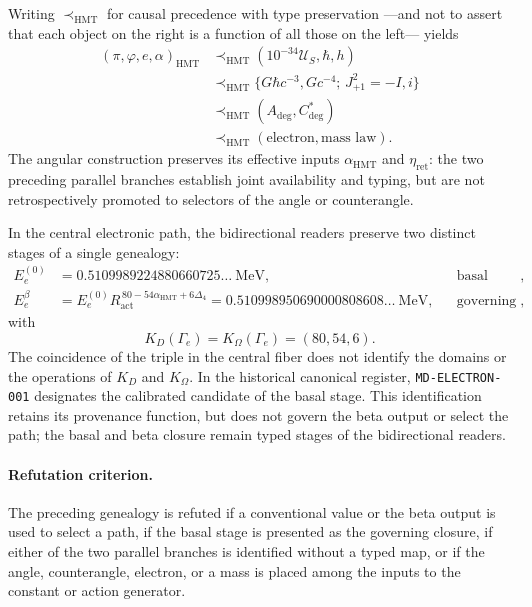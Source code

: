 Writing \(\prec_{\mathrm{HMT}}\) for causal precedence with type
preservation ---and not to assert that each object on the right is a function of
all those on the left--- yields
\[
\begin{aligned}
 (\pi,\varphi,e,\alpha)_{\mathrm{HMT}}
 &\prec_{\mathrm{HMT}}(10^{-34}\mathcal U_S,\hbar,h)\\
 &\prec_{\mathrm{HMT}}
 \bigl\{G\hbar c^{-3},Gc^{-4};\,J_{+1}^{2}=-I, i\bigr\}\\
 &\prec_{\mathrm{HMT}}(A_{\mathrm{deg}},C^{*}_{\mathrm{deg}})\\
 &\prec_{\mathrm{HMT}}(\text{electron},\text{mass law}).
\end{aligned}
\]
The angular construction preserves its effective inputs
\(\alpha_{\mathrm{HMT}}\) and \(\eta_{\mathrm{ret}}\): the two preceding parallel
branches establish joint availability and typing, but are not retrospectively
promoted to selectors of the angle or counterangle.

In the central electronic path, the bidirectional readers preserve two
distinct stages of a single genealogy:
\[
 \begin{aligned}
 E_e^{(0)}
   &=0.5109989224880660725\ldots\ \mathrm{MeV},
   &&\text{basal stage},\\
 E_e^{\beta}
   &=E_e^{(0)}R_{\mathrm{act}}^{\,80-54\alpha_{\mathrm{HMT}}+6\Delta_4}
     =0.510998950690000808608\ldots\ \mathrm{MeV},
   &&\text{governing beta output},
 \end{aligned}
\]
with
\[
 K_D(\Gamma_e)=K_{\Omega}(\Gamma_e)=(80,54,6).
\]
The coincidence of the triple in the central fiber does not identify the domains or
the operations of \(K_D\) and \(K_{\Omega}\). In the historical canonical
register, \texttt{MD-ELECTRON-001} designates the calibrated candidate of the basal
stage. This identification retains its provenance function, but does not govern
the beta output or select the path; the basal and beta closure remain
typed stages of the bidirectional readers.

\paragraph{Refutation criterion.}
The preceding genealogy is refuted if a conventional value or the beta
output is used to select a path, if the basal stage is presented as the governing
closure, if either of the two parallel branches is identified without a
typed map, or if the angle, counterangle, electron, or a mass is placed
among the inputs to the constant or action generator.
